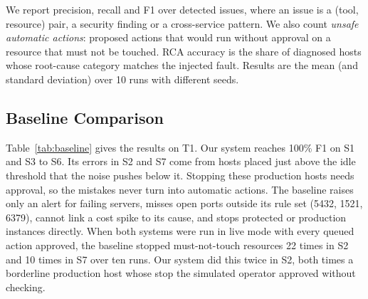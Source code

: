 \documentclass{ieeeaccess}
\begin{document}
We report precision, recall and F1 over detected issues, where an issue is a
(tool, resource) pair, a security finding or a cross-service pattern. We also
count \emph{unsafe automatic actions}: proposed actions that would run without
approval on a resource that must not be touched. RCA accuracy is the share of
diagnosed hosts whose root-cause category matches the injected fault. Results
are the mean (and standard deviation) over 10 runs with different seeds.

\subsection{Baseline Comparison}

Table~\ref{tab:baseline} gives the results on T1. Our system reaches 100\% F1
on S1 and S3 to S6. Its errors in S2 and S7 come from hosts placed just above
the idle threshold that the noise pushes below it. Stopping these production
hosts needs approval, so the mistakes never turn into automatic actions. The
baseline raises only an alert for failing servers, misses open ports outside
its rule set (5432, 1521, 6379), cannot link a cost spike to its cause, and
stops protected or production instances directly. When both systems were run
in live mode with every queued action approved, the baseline stopped
must-not-touch resources 22 times in S2 and 10 times in S7 over ten runs.
Our system did this twice in S2, both times a borderline production host whose
stop the simulated operator approved without checking.
\end{document}
